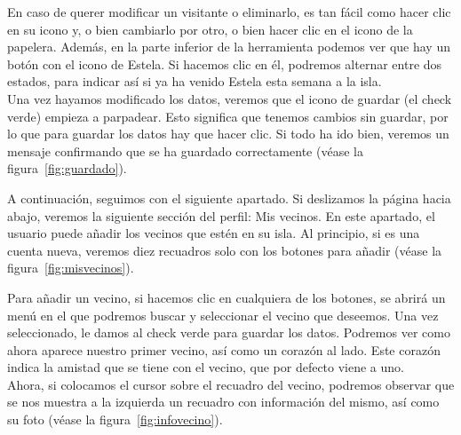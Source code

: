 
En caso de querer modificar un visitante o eliminarlo, es tan fácil como hacer clic en su icono y, o bien cambiarlo por otro, o bien hacer clic en el icono de la papelera. Además, en la parte inferior de la herramienta podemos ver que hay un botón con el icono de Estela. Si hacemos clic en él, podremos alternar entre dos estados, para indicar así si ya ha venido Estela esta semana a la isla.\\

Una vez hayamos modificado los datos, veremos que el icono de guardar (el check verde) empieza a parpadear. Esto significa que tenemos cambios sin guardar, por lo que para guardar los datos hay que hacer clic. Si todo ha ido bien, veremos un mensaje confirmando que se ha guardado correctamente {(v\'ease la figura~\ref{fig:guardado})}.\\


\clearpage

A continuación, seguimos con el siguiente apartado. Si deslizamos la página hacia abajo, veremos la siguiente sección del perfil: Mis vecinos. En este apartado, el usuario puede añadir los vecinos que estén en su isla. Al principio, si es una cuenta nueva, veremos diez recuadros solo con los botones para añadir {(v\'ease la figura~\ref{fig:misvecinos})}.\\


Para añadir un vecino, si hacemos clic en cualquiera de los botones, se abrirá un menú en el que podremos buscar y seleccionar el vecino que deseemos. Una vez seleccionado, le damos al check verde para guardar los datos. Podremos ver como ahora aparece nuestro primer vecino, así como un corazón al lado. Este corazón indica la amistad que se tiene con el vecino, que por defecto viene a uno.\\

Ahora, si colocamos el cursor sobre el recuadro del vecino, podremos observar que se nos muestra a la izquierda un recuadro con información del mismo, así como su foto {(v\'ease la figura~\ref{fig:infovecino})}.\\


